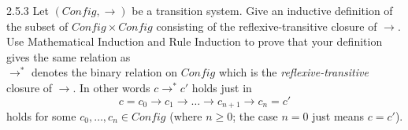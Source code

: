 \begin{exercise}{2.5.3}
Let $(Config, \rightarrow) $ be a transition system. Give an inductive definition of the subset of $Config \times Config$ consisting of the reflexive-transitive closure of $\rightarrow$. Use Mathematical Induction and Rule Induction to prove that your  definition gives the same relation as
\\
$\to^*$ denotes the binary relation on $Config$ which is the \textit{reflexive-transitive} closure of $\to$. In other words $c\rightarrow^* c'$ holds just in 
\[c = c_0 \rightarrow c_1 \rightarrow \dots \rightarrow c_{n+1} \to c_n = c'\]
holds for some $c_0,\dots, c_n \in Config $ (where $n \geq 0$; the case $n=0$ just means $c=c'$).

\end{exercise}

